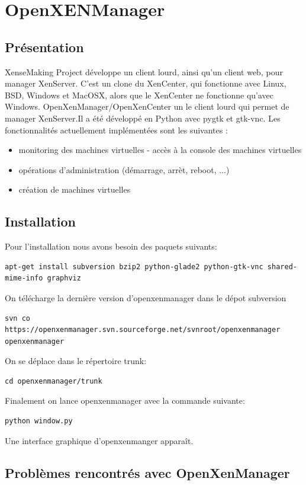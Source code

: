 \lstset{language=bash}
\chapter{OpenXENManager}
\section{Présentation}
XenseMaking Project développe un client lourd, ainsi qu'un client
web, pour manager XenServer. C'est un clone du XenCenter, qui fonctionne
avec Linux, BSD, Windows et MacOSX, alors que le XenCenter ne fonctionne
qu'avec Windows. OpenXenManager/OpenXenCenter un le client lourd qui
permet de manager XenServer.Il a été développé en Python avec pygtk
et gtk-vnc.
Les fonctionnalités actuellement implémentées sont les suivantes :
\begin{itemize}
\item monitoring des machines virtuelles - accès à la console des machines virtuelles
\item opérations d'administration (démarrage, arrèt, reboot, ...)
\item création de machines virtuelles
\end{itemize}
\section{Installation}
Pour l'installation nous avons besoin des paquets suivants:
\begin{lstlisting}
apt-get install subversion bzip2 python-glade2 python-gtk-vnc shared-mime-info graphviz
\end{lstlisting}
On télécharge la dernière version d'openxenmanager dans le dépot subversion
\begin{lstlisting}
svn co https://openxenmanager.svn.sourceforge.net/svnroot/openxenmanager openxenmanager
\end{lstlisting}
On se déplace dans le répertoire trunk:
\begin{lstlisting}
cd openxenmanager/trunk
\end{lstlisting}
Finalement on lance openxenmanager avec la commande suivante:
\begin{lstlisting}
python window.py
\end{lstlisting}
Une interface graphique d'openxenmanger apparaît.

\section{Problèmes rencontrés avec OpenXenManager}

